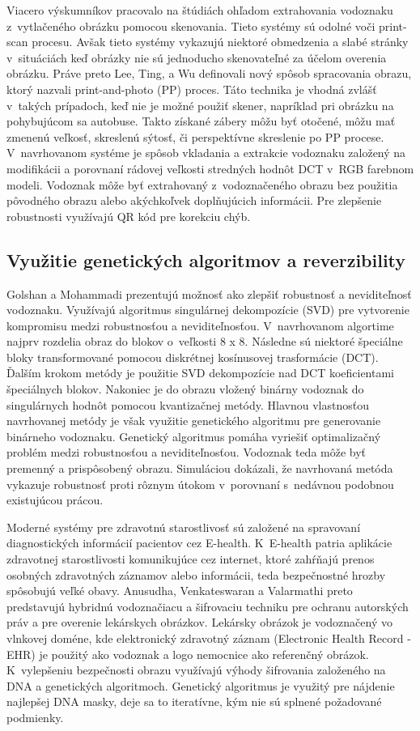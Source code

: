 Viacero výskumníkov pracovalo na štúdiách ohľadom extrahovania vodoznaku z~vytlačeného obrázku pomocou skenovania. Tieto systémy sú odolné voči print-scan procesu. Avšak tieto systémy vykazujú niektoré obmedzenia a slabé stránky v~situáciách keď obrázky nie sú jednoducho skenovateľné za účelom overenia obrázku. Práve preto Lee, Ting, a Wu \cite{Lee2016} definovali nový spôsob spracovania obrazu, ktorý nazvali print-and-photo (PP) proces. Táto technika je vhodná zvlášť v~takých prípadoch, keď nie je možné použiť skener, napríklad pri obrázku na pohybujúcom sa autobuse. Takto získané zábery môžu byť otočené, môžu mať zmenenú veľkosť, skreslenú sýtosť, či perspektívne skreslenie po PP procese. V~navrhovanom systéme je spôsob vkladania a extrakcie vodoznaku založený na modifikácii a porovnaní rádovej veľkosti stredných hodnôt DCT v~RGB farebnom modeli. Vodoznak môže byť extrahovaný z~vodoznačeného obrazu bez použitia pôvodného obrazu alebo akýchkoľvek doplňujúcich informácii. Pre zlepšenie robustnosti využívajú QR kód pre korekciu chýb.

\subsection{Využitie genetických algoritmov a reverzibility}
Golshan a Mohammadi \cite{Golshan} prezentujú možnosť ako zlepšiť robustnosť a neviditeľnosť vodoznaku. Využívajú algoritmus singulárnej dekompozície (SVD) pre vytvorenie kompromisu medzi robustnosťou a neviditeľnosťou. V~navrhovanom algortime najprv rozdelia obraz do blokov o~veľkosti 8 x 8. Následne sú niektoré špeciálne bloky transformované pomocou diskrétnej kosínusovej trasformácie (DCT). Ďalším krokom metódy je použitie SVD dekompozície nad DCT koeficientami špeciálnych blokov. Nakoniec je do obrazu vložený binárny vodoznak do singulárnych hodnôt pomocou kvantizačnej metódy. Hlavnou vlastnosťou navrhovanej metódy je však využitie genetického algoritmu pre generovanie binárneho vodoznaku. Genetický algoritmus pomáha vyriešiť optimalizačný problém medzi robustnosťou a neviditeľnosťou. Vodoznak teda môže byť premenný a prispôsobený obrazu. Simuláciou dokázali, že navrhovaná metóda vykazuje robustnosť proti rôznym útokom v~porovnaní s~nedávnou podobnou existujúcou prácou.

Moderné systémy pre zdravotnú starostlivosť sú založené na spravovaní diagnostických informácií pacientov cez E-health. K~E-health patria aplikácie zdravotnej starostlivosti komunikujúce cez internet, ktoré zahŕňajú prenos osobných zdravotných záznamov alebo informácii, teda bezpečnostné hrozby spôsobujú veľké obavy. Anusudha, Venkateswaran a Valarmathi \cite{Anusudha2017} preto predstavujú hybridnú vodoznačiacu a šifrovaciu techniku pre ochranu autorských práv a pre overenie lekárskych obrázkov. Lekársky obrázok je vodoznačený vo vlnkovej doméne, kde elektronický zdravotný záznam (Electronic Health Record - EHR) je použitý ako vodoznak a logo nemocnice ako referenčný obrázok. K~vylepšeniu bezpečnosti obrazu využívajú výhody šifrovania založeného na DNA a genetických algoritmoch. Genetický algoritmus je využitý pre nájdenie najlepšej DNA masky, deje sa to iteratívne, kým nie sú splnené požadované podmienky.

